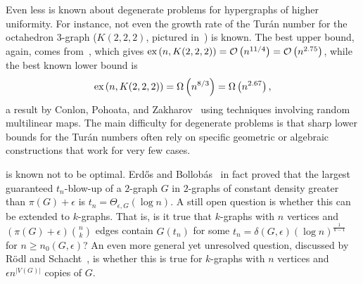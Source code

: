 Even less is known about degenerate problems for hypergraphs of higher uniformity.
For instance, not even the growth rate of the Turán number for the octahedron 3-graph
($K(2, 2, 2)$, pictured in~) is known.
The best upper bound, again, comes from~, which gives
$\text{ex} \left( n, K(2, 2, 2) \right) = \mathcal{O}\left(n^{11/4}\right) = \mathcal{O}\left(n^{2.75}\right)$,
while the best known lower bound is
\[
    \text{ex} \left( n, K(2, 2, 2) \right) = \Omega\left(n^{8/3}\right) = \Omega\left(n^{2.67}\right),
\]
a result by Conlon, Pohoata, and Zakharov~\cite{conlon2020random} using techniques involving random multilinear maps.
The main difficulty for degenerate problems is that sharp lower bounds for the Turán numbers
often rely on specific geometric or algebraic constructions that work for very few cases.

 is known not to be optimal.
Erdős and Bollobás~\cite{bollobas1973structure} in fact proved that the largest
guaranteed $t_n$-blow-up of a $2$-graph $G$ in $2$-graphs of constant density greater than $\pi(G) + \epsilon$ is
$t_n = \Theta_{\epsilon, G}( \log n)$.
A still open question is whether this can be extended to $k$-graphs.
That is, is it true that $k$-graphs with $n$ vertices and  $\left(\pi(G) + \epsilon \right)  \binom{n}{k}$ edges
contain $G(t_n)$ for some $t_n = \delta(G, \epsilon) (\log n)^{\frac{1}{k-1}}$ for $n \geq n_0(G, \epsilon)$?
An even more general yet unresolved question, discussed by Rödl and Schacht~\cite{rodl2012complete}, is whether this is true for
$k$-graphs with $n$ vertices and $\epsilon n^{|V(G)|}$ copies of $G$.

